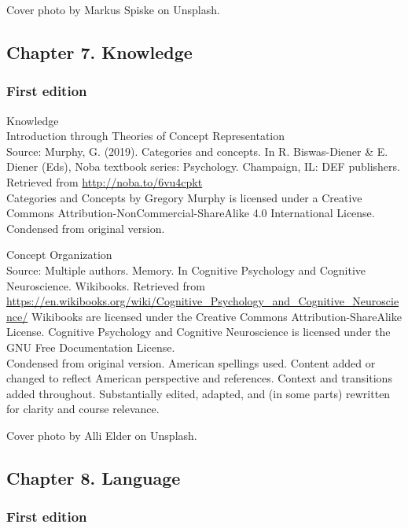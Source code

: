 \documentclass[
]{krantz}
\begin{document}
Cover photo by Markus Spiske on Unsplash.

\hypertarget{chapter-7.-knowledge}{%
\subsection*{Chapter 7. Knowledge}\label{chapter-7.-knowledge}}


\hypertarget{first-edition-7}{%
\subsubsection*{First edition}\label{first-edition-7}}


Knowledge\\
Introduction through Theories of Concept Representation\\
Source: Murphy, G. (2019). Categories and concepts. In R. Biswas-Diener \& E. Diener (Eds), Noba textbook series: Psychology. Champaign, IL: DEF publishers. Retrieved from \url{http://noba.to/6vu4cpkt}\\
Categories and Concepts by Gregory Murphy is licensed under a Creative Commons Attribution-NonCommercial-ShareAlike 4.0 International License.\\
Condensed from original version.

Concept Organization\\
Source: Multiple authors. Memory. In Cognitive Psychology and Cognitive Neuroscience. Wikibooks. Retrieved from \url{https://en.wikibooks.org/wiki/Cognitive_Psychology_and_Cognitive_Neuroscience/}
Wikibooks are licensed under the Creative Commons Attribution-ShareAlike License.
Cognitive Psychology and Cognitive Neuroscience is licensed under the GNU Free Documentation License.\\
Condensed from original version. American spellings used. Content added or changed to reflect American perspective and references. Context and transitions added throughout. Substantially edited, adapted, and (in some parts) rewritten for clarity and course relevance.

Cover photo by Alli Elder on Unsplash.

\hypertarget{chapter-8.-language}{%
\subsection*{Chapter 8. Language}\label{chapter-8.-language}}


\hypertarget{first-edition-8}{%
\subsubsection*{First edition}\label{first-edition-8}}
\end{document}
